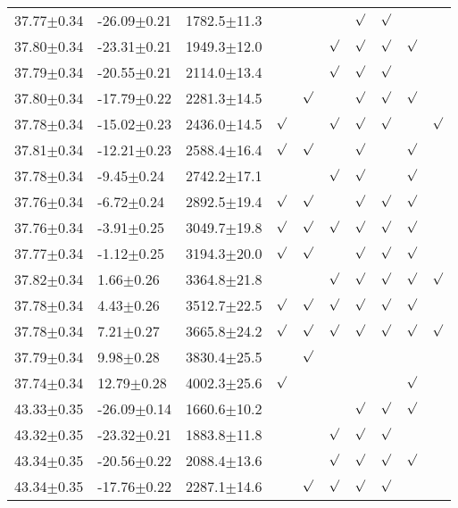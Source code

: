 \begin{table}[h]
\begin{center}
\begin{tabular}{llllllllll}
37.77$\pm$0.34 & -26.09$\pm$0.21 & 1782.5$\pm$11.3& & & & $\surd$ & $\surd$ & & \\
37.80$\pm$0.34 & -23.31$\pm$0.21 & 1949.3$\pm$12.0& & & $\surd$ & $\surd$ & $\surd$ & $\surd$ & \\
37.79$\pm$0.34 & -20.55$\pm$0.21 & 2114.0$\pm$13.4& & & $\surd$ & $\surd$ & $\surd$ & & \\
37.80$\pm$0.34 & -17.79$\pm$0.22 & 2281.3$\pm$14.5& & $\surd$ & & $\surd$ & $\surd$ & $\surd$ & \\
37.78$\pm$0.34 & -15.02$\pm$0.23 & 2436.0$\pm$14.5& $\surd$ & & $\surd$ & $\surd$ & $\surd$ & & $\surd$ \\
37.81$\pm$0.34 & -12.21$\pm$0.23 & 2588.4$\pm$16.4& $\surd$ & $\surd$ & & $\surd$ & & $\surd$ & \\
37.78$\pm$0.34 & -9.45$\pm$0.24 & 2742.2$\pm$17.1& & & $\surd$ & $\surd$ & & $\surd$ & \\
37.76$\pm$0.34 & -6.72$\pm$0.24 & 2892.5$\pm$19.4& $\surd$ & $\surd$ & & $\surd$ & $\surd$ & $\surd$ & \\
37.76$\pm$0.34 & -3.91$\pm$0.25 & 3049.7$\pm$19.8& $\surd$ & $\surd$ & $\surd$ & $\surd$ & $\surd$ & $\surd$ & \\
37.77$\pm$0.34 & -1.12$\pm$0.25 & 3194.3$\pm$20.0& $\surd$ & $\surd$ & & $\surd$ & $\surd$ & $\surd$ & \\
37.82$\pm$0.34 & 1.66$\pm$0.26 & 3364.8$\pm$21.8& & & $\surd$ & $\surd$ & $\surd$ & $\surd$ & $\surd$ \\
37.78$\pm$0.34 & 4.43$\pm$0.26 & 3512.7$\pm$22.5& $\surd$ & $\surd$ & $\surd$ & $\surd$ & $\surd$ & $\surd$ & \\
37.78$\pm$0.34 & 7.21$\pm$0.27 & 3665.8$\pm$24.2& $\surd$ & $\surd$ & $\surd$ & $\surd$ & $\surd$ & $\surd$ & $\surd$ \\
37.79$\pm$0.34 & 9.98$\pm$0.28 & 3830.4$\pm$25.5& & $\surd$ & & & & & \\
37.74$\pm$0.34 & 12.79$\pm$0.28 & 4002.3$\pm$25.6& $\surd$ & & & & & $\surd$ & \\
43.33$\pm$0.35 & -26.09$\pm$0.14 & 1660.6$\pm$10.2& & & & $\surd$ & $\surd$ & $\surd$ & \\
43.32$\pm$0.35 & -23.32$\pm$0.21 & 1883.8$\pm$11.8& & & $\surd$ & $\surd$ & $\surd$ & & \\
43.34$\pm$0.35 & -20.56$\pm$0.22 & 2088.4$\pm$13.6& & & $\surd$ & $\surd$ & $\surd$ & $\surd$ & \\
43.34$\pm$0.35 & -17.76$\pm$0.22 & 2287.1$\pm$14.6& & $\surd$ & $\surd$ & $\surd$ & $\surd$ & & \\

\end{tabular}
\end{center}
\end{table}
